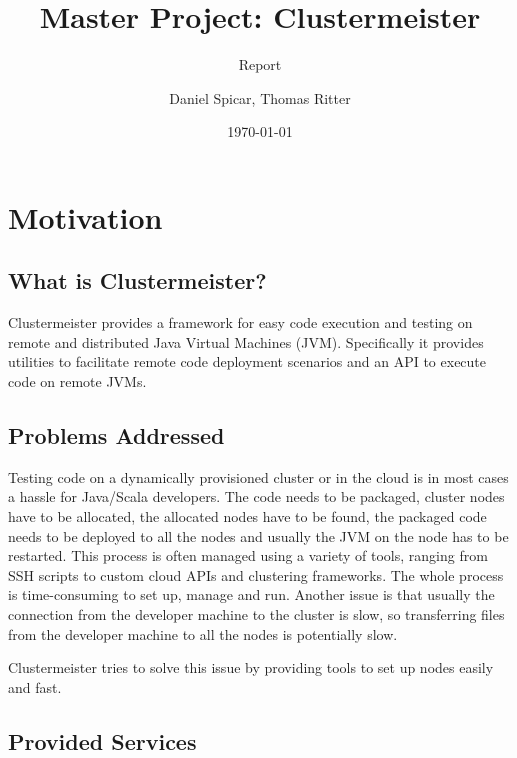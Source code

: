 \documentclass[english]{uzhpub}
\begin{document}
\title{Master Project: Clustermeister}

\subtitle{Report}

\author{Daniel Spicar, Thomas Ritter}

\date{\today}

\maketitle

\section{Motivation}

\subsection{What is Clustermeister?}
Clustermeister provides a framework for easy code execution and testing on remote and distributed Java Virtual Machines (JVM). Specifically it provides utilities to facilitate remote code deployment scenarios and an API to execute code on remote JVMs.

\subsection{Problems Addressed}
Testing code on a dynamically provisioned cluster or in the cloud is in most cases a hassle for Java/Scala developers. The code needs to be packaged, cluster nodes have to be allocated, the allocated nodes have to be found, the packaged code needs to be deployed to all the nodes and usually the JVM on the node has to be restarted. This process is often managed using a variety of tools, ranging from SSH scripts to custom cloud APIs and clustering frameworks. The whole process is time-consuming to set up, manage and run. Another issue is that usually the connection from the developer machine to the cluster is slow, so transferring files from the developer machine to all the nodes is potentially slow. 

Clustermeister tries to solve this issue by providing tools to set up nodes easily and fast.


\subsection{Provided Services}
\end{document}
